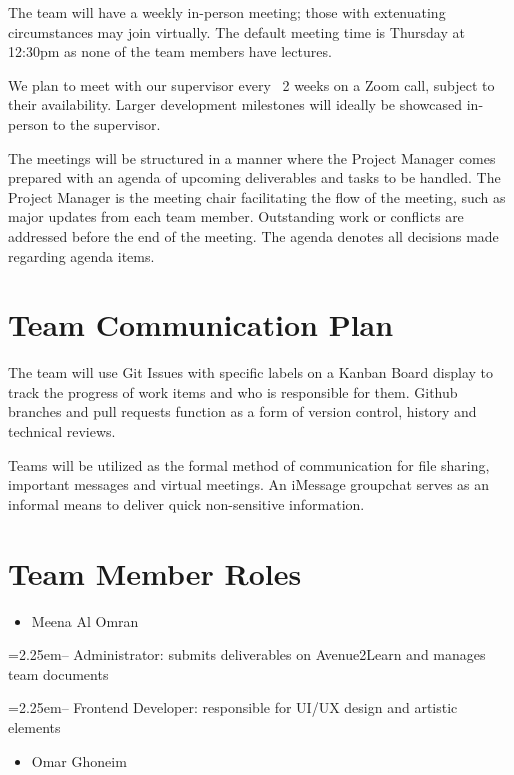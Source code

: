 \documentclass{article}
\begin{document}
The team will have a weekly in-person meeting; those with extenuating circumstances may join virtually. The default meeting time is Thursday at 12:30pm as none of the team members have lectures.

We plan to meet with our supervisor every ~2 weeks on a Zoom call, subject to their availability. Larger development milestones will ideally be showcased in-person to the supervisor.

The meetings will be structured in a manner where the Project Manager comes prepared with an agenda of upcoming deliverables and tasks to be handled. The Project Manager is the meeting chair facilitating the flow of the meeting, such as major updates from each team member. Outstanding work or conflicts are addressed before the end of the meeting. The agenda denotes all decisions made regarding agenda items.



\section{Team Communication Plan}

The team will use Git Issues with specific labels on a Kanban Board display to track the progress of work items and who is responsible for them. Github branches and pull requests function as a form of version control, history and technical reviews. 

Teams will be utilized as the formal method of communication for file sharing, important messages and virtual meetings. An iMessage groupchat serves as an informal means to deliver quick non-sensitive information.

\section{Team Member Roles}

\begin{itemize}
  \item Meena Al Omran
\end{itemize}

\hangindent=2.25em-- Administrator: submits deliverables on Avenue2Learn and manages team documents

\hangindent=2.25em-- Frontend Developer: responsible for UI/UX design and artistic elements

\begin{itemize}
  \item Omar Ghoneim
\end{itemize}
\end{document}
